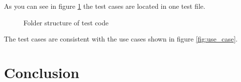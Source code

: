        As you can see in figure \ref{fig:folder_test} the test cases are located in one test file.
        \begin{figure}[h]
            \caption{Folder structure of test code}
            \label{fig:folder_test}
        \end{figure}

        The test cases are consistent with the use cases shown in figure \ref{fig:use_case}.

        


\chapter{Conclusion} %

